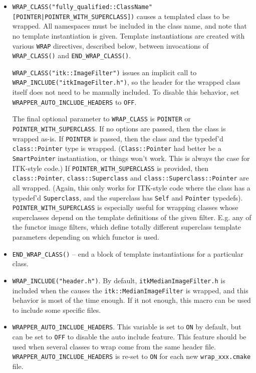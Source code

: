 \documentclass{InsightArticle}
\begin{document}
\begin{itemize}
  \item \verb$WRAP_CLASS("fully_qualified::ClassName" [POINTER|POINTER_WITH_SUPERCLASS])$
causes a templated class to be wrapped. All namespaces must be included in the
class name, and note that no template instantiation is given. Template
instantiations are created with various \verb$WRAP$ directives, described below,
between invocations of \verb$WRAP_CLASS()$ and \verb$END_WRAP_CLASS()$.

\verb$WRAP_CLASS("itk::ImageFilter")$ issues an implicit call to \verb$WRAP_INCLUDE("itkImageFilter.h")$, so the header
for the wrapped class itself does not need to be manually included. To disable
this behavior, set \verb$WRAPPER_AUTO_INCLUDE_HEADERS$ to \verb$OFF$.

The final optional parameter to \verb$WRAP_CLASS$ is \verb$POINTER$ or
\verb$POINTER_WITH_SUPERCLASS$. If no options are passed, then the class is wrapped
as-is. If \verb$POINTER$ is passed, then the class and the typedef'd \verb$class::Pointer$
type is wrapped. (\verb$Class::Pointer$ had better be a \verb$SmartPointer$ instantiation, or
things won't work. This is always the case for ITK-style code.) If
\verb$POINTER_WITH_SUPERCLASS$ is provided, then \verb$class::Pointer$, \verb$class::Superclass$ and
\verb$class::Superclass::Pointer$ are all wrapped. (Again, this only works for
ITK-style code where the class has a typedef'd \verb$Superclass$, and the superclass
has \verb$Self$ and \verb$Pointer$ typedefs). \verb$POINTER_WITH_SUPERCLASS$ is especially
useful for wrapping classes whose superclasses depend on the template definitions of the given
filter. E.g. any of the functor image filters, which define  totally different superclass
template parameters depending on which functor is used.

  \item \verb$END_WRAP_CLASS()$ -- end a block of template instantiations for a particular
class.

  \item \verb$WRAP_INCLUDE("header.h")$. By default, \verb$itkMedianImageFilter.h$ is included
when the  causes the \verb$itk::MedianImageFilter$ is wrapped, and this behavior is most of the
time enough. If it not enough, this macro can be used to include some specific files.

  \item \verb$WRAPPER_AUTO_INCLUDE_HEADERS$. This variable is set to \verb$ON$ by default, but can
be set to \verb$OFF$ to disable the auto include feature. This feature should be used when several
classes to wrap come from the same header file.
\verb$WRAPPER_AUTO_INCLUDE_HEADERS$ is re-set to \verb$ON$ for each new \verb$wrap_xxx.cmake$ file.


\end{itemize}
\end{document}
